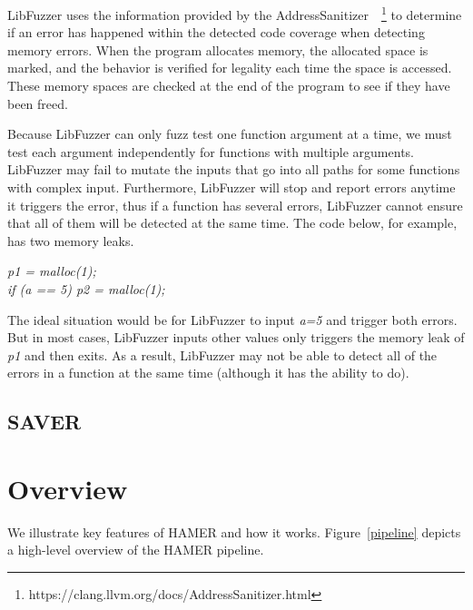 \documentclass[a4paper,11pt,oneside,openany]{book}
\begin{document}
LibFuzzer uses the information provided by the AddressSanitizer~\cite{asan}~\footnote{https://clang.llvm.org/docs/AddressSanitizer.html} to determine if an error has happened within the detected code coverage when detecting memory errors. When the program allocates memory, the allocated space is marked, and the behavior is verified for legality each time the space is accessed. These memory spaces are checked at the end of the program to see if they have been freed.



Because LibFuzzer can only fuzz test one function argument at a time, we must test each argument independently for functions with multiple arguments. LibFuzzer may fail to mutate the inputs that go into all paths for some functions with complex input. Furthermore, LibFuzzer will stop and report errors anytime it triggers the error, thus if a function has several errors, LibFuzzer cannot ensure that all of them will be detected at the same time. The code below, for example, has two memory leaks. 


\begin{minipage}{\textwidth}
    \vspace{0.2cm}
    \textsl{\hspace{0.3cm}p1 = malloc(1);\\\hspace{0.3cm}if (a == 5) p2 = malloc(1);\\}
\end{minipage}
The ideal situation would be for LibFuzzer to input {\it a=5} and trigger both errors. But in most cases,  LibFuzzer inputs other values only triggers the memory leak of {\it p1} and then exits. As a result, LibFuzzer may not be able to detect all of the errors in a function at the same time (although it has the ability to do).


\section{SAVER}

\chapter{Overview}
\label{overview}
We illustrate key features of HAMER and how it works. Figure~\ref{pipeline} depicts a high-level overview of the HAMER pipeline.
\end{document}
